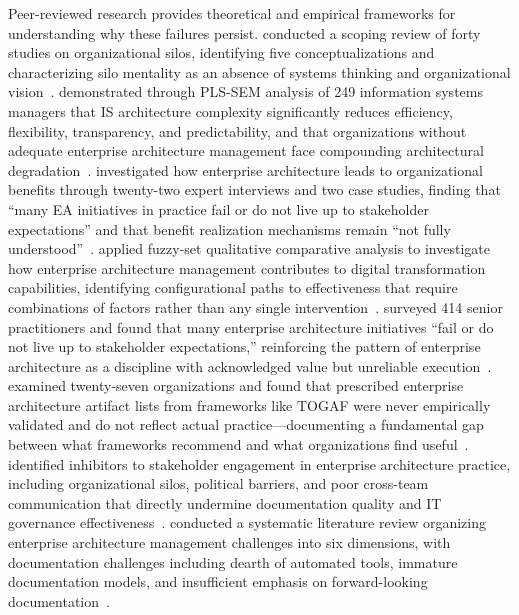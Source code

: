 Peer-reviewed research provides theoretical and empirical frameworks for understanding why these failures persist. \citeauthor{Bento_Tagliabue_Lorenzo_2020} conducted a scoping review of forty studies on organizational silos, identifying five conceptualizations and characterizing silo mentality as an absence of systems thinking and organizational vision~\parencite{Bento_Tagliabue_Lorenzo_2020}. \citeauthor{Beese_2023} demonstrated through PLS-SEM analysis of 249 information systems managers that IS architecture complexity significantly reduces efficiency, flexibility, transparency, and predictability, and that organizations without adequate enterprise architecture management face compounding architectural degradation~\parencite{Beese_2023}. \citeauthor{Tamm_2022} investigated how enterprise architecture leads to organizational benefits through twenty-two expert interviews and two case studies, finding that ``many EA initiatives in practice fail or do not live up to stakeholder expectations'' and that benefit realization mechanisms remain ``not fully understood''~\parencite{Tamm_2022}. \citeauthor{Pattij_2022} applied fuzzy-set qualitative comparative analysis to investigate how enterprise architecture management contributes to digital transformation capabilities, identifying configurational paths to effectiveness that require combinations of factors rather than any single intervention~\parencite{Pattij_2022}. \citeauthor{van_de_Wetering_2022} surveyed 414 senior practitioners and found that many enterprise architecture initiatives ``fail or do not live up to stakeholder expectations,'' reinforcing the pattern of enterprise architecture as a discipline with acknowledged value but unreliable execution~\parencite{van_de_Wetering_2022}. \citeauthor{Kotusev_2019} examined twenty-seven organizations and found that prescribed enterprise architecture artifact lists from frameworks like TOGAF were never empirically validated and do not reflect actual practice---documenting a fundamental gap between what frameworks recommend and what organizations find useful~\parencite{Kotusev_2019}. \citeauthor{Kurnia_2021} identified inhibitors to stakeholder engagement in enterprise architecture practice, including organizational silos, political barriers, and poor cross-team communication that directly undermine documentation quality and IT governance effectiveness~\parencite{Kurnia_2021}. \citeauthor{Bree_Karger_2022} conducted a systematic literature review organizing enterprise architecture management challenges into six dimensions, with documentation challenges including dearth of automated tools, immature documentation models, and insufficient emphasis on forward-looking documentation~\parencite{Bree_Karger_2022}.

